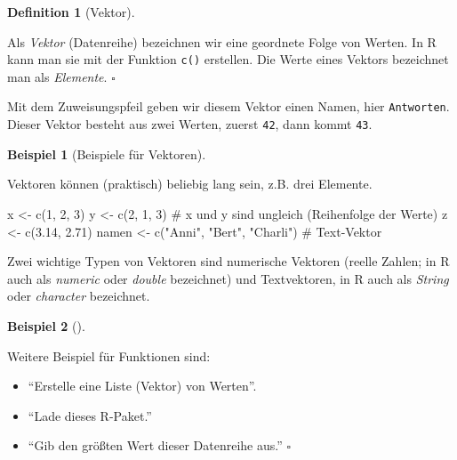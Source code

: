 \documentclass[
  a4paper,
]{scrbook}
\newenvironment{Shaded}{\begin{snugshade}}{\end{snugshade}}
\newcommand{\CommentTok}[1]{\textcolor[rgb]{0.37,0.37,0.37}{#1}}
\newcommand{\DecValTok}[1]{\textcolor[rgb]{0.68,0.00,0.00}{#1}}
\newcommand{\FloatTok}[1]{\textcolor[rgb]{0.68,0.00,0.00}{#1}}
\newcommand{\FunctionTok}[1]{\textcolor[rgb]{0.28,0.35,0.67}{#1}}
\newcommand{\NormalTok}[1]{\textcolor[rgb]{0.00,0.23,0.31}{#1}}
\newcommand{\OtherTok}[1]{\textcolor[rgb]{0.00,0.23,0.31}{#1}}
\newcommand{\StringTok}[1]{\textcolor[rgb]{0.13,0.47,0.30}{#1}}
\providecommand{\tightlist}{%
  \setlength{\itemsep}{0pt}\setlength{\parskip}{0pt}}\usepackage{longtable,booktabs,array}
\theoremstyle{definition}
\newtheorem{example}{Beispiel}[chapter]
\theoremstyle{definition}
\newtheorem{definition}{Definition}[chapter]
\theoremstyle{definition}
\theoremstyle{remark}
\begin{document}
\begin{definition}[Vektor]\protect\hypertarget{def-vektor}{}\label{def-vektor}

Als \emph{Vektor} (Datenreihe) bezeichnen wir eine geordnete Folge von
Werten. In R kann man sie mit der Funktion \texttt{c()} erstellen. Die
Werte eines Vektors bezeichnet man als \emph{Elemente}. \(\square\)

\end{definition}

Mit dem Zuweisungspfeil geben wir diesem Vektor einen Namen, hier
\texttt{Antworten}. Dieser Vektor besteht aus zwei Werten, zuerst
\texttt{42}, dann kommt \texttt{43}.

\begin{example}[Beispiele für
Vektoren]\protect\hypertarget{exm-vektoren}{}\label{exm-vektoren}

Vektoren können (praktisch) beliebig lang sein, z.B. drei Elemente.

\begin{Shaded}
\begin{Highlighting}[]
\NormalTok{x }\OtherTok{\textless{}{-}} \FunctionTok{c}\NormalTok{(}\DecValTok{1}\NormalTok{, }\DecValTok{2}\NormalTok{, }\DecValTok{3}\NormalTok{)}
\NormalTok{y }\OtherTok{\textless{}{-}} \FunctionTok{c}\NormalTok{(}\DecValTok{2}\NormalTok{, }\DecValTok{1}\NormalTok{, }\DecValTok{3}\NormalTok{)  }\CommentTok{\# x und y sind ungleich (Reihenfolge der Werte)}
\NormalTok{z }\OtherTok{\textless{}{-}} \FunctionTok{c}\NormalTok{(}\FloatTok{3.14}\NormalTok{, }\FloatTok{2.71}\NormalTok{)  }
\NormalTok{namen }\OtherTok{\textless{}{-}} \FunctionTok{c}\NormalTok{(}\StringTok{"Anni"}\NormalTok{, }\StringTok{"Bert"}\NormalTok{, }\StringTok{"Charli"}\NormalTok{) }\CommentTok{\# Text{-}Vektor}
\end{Highlighting}
\end{Shaded}

\end{example}

Zwei wichtige Typen von Vektoren sind numerische Vektoren (reelle
Zahlen; in R auch als \emph{numeric} oder \emph{double} bezeichnet) und
Textvektoren, in R auch als \emph{String} oder \emph{character}
bezeichnet.

\begin{example}[]\protect\hypertarget{exm-funs}{}\label{exm-funs}

Weitere Beispiel für Funktionen sind:

\begin{itemize}
\tightlist
\item
  ``Erstelle eine Liste (Vektor) von Werten''.
\item
  ``Lade dieses R-Paket.''
\item
  ``Gib den größten Wert dieser Datenreihe aus.'' \(\square\)
\end{itemize}

\end{example}
\end{document}
